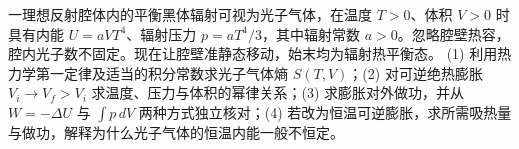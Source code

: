 一理想反射腔体内的平衡黑体辐射可视为光子气体，在温度 \(T>0\)、体积 \(V>0\) 时具有内能 \(U=aVT^4\)、辐射压力 \(p=aT^4/3\)，其中辐射常数 \(a>0\)。忽略腔壁热容，腔内光子数不固定。现在让腔壁准静态移动，始末均为辐射热平衡态。
(1) 利用热力学第一定律及适当的积分常数求光子气体熵 \(S(T,V)\)；(2) 对可逆绝热膨胀 \(V_i\to V_f>V_i\) 求温度、压力与体积的幂律关系；(3) 求膨胀对外做功，并从 \(W=-\Delta U\) 与 \(\int p\,dV\) 两种方式独立核对；(4) 若改为恒温可逆膨胀，求所需吸热量与做功，解释为什么光子气体的恒温内能一般不恒定。
